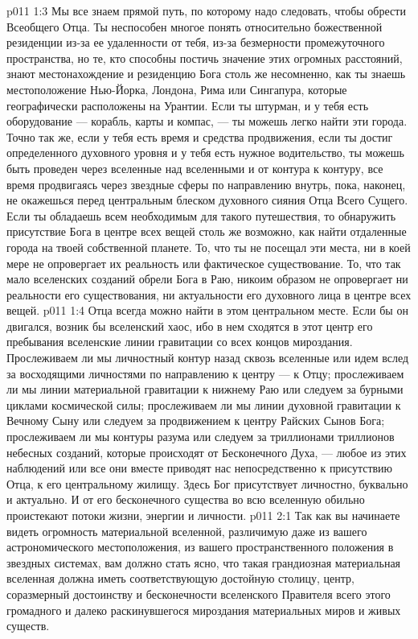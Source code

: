 \vs p011 1:3 \pc Мы все знаем прямой путь, по которому надо следовать, чтобы обрести Всеобщего Отца. Ты неспособен многое понять относительно божественной резиденции из\hyp{}за ее удаленности от тебя, из\hyp{}за безмерности промежуточного пространства, но те, кто способны постичь значение этих огромных расстояний, знают местонахождение и резиденцию Бога столь же несомненно, как ты знаешь местоположение Нью\hyp{}Йорка, Лондона, Рима или Сингапура, которые географически расположены на Урантии. Если ты штурман, и у тебя есть оборудование --- корабль, карты и компас, --- ты можешь легко найти эти города. Точно так же, если у тебя есть время и средства продвижения, если ты достиг определенного духовного уровня и у тебя есть нужное водительство, ты можешь быть проведен через вселенные над вселенными и от контура к контуру, все время продвигаясь через звездные сферы по направлению внутрь, пока, наконец, не окажешься перед центральным блеском духовного сияния Отца Всего Сущего. Если ты обладаешь всем необходимым для такого путешествия, то обнаружить присутствие Бога в центре всех вещей столь же возможно, как найти отдаленные города на твоей собственной планете. То, что ты не посещал эти места, ни в коей мере не опровергает их реальность или фактическое существование. То, что так мало вселенских созданий обрели Бога в Раю, никоим образом не опровергает ни реальности его существования, ни актуальности его духовного лица в центре всех вещей.
\vs p011 1:4 Отца всегда можно найти в этом центральном месте. Если бы он двигался, возник бы вселенский хаос, ибо в нем сходятся в этот центр его пребывания вселенские линии гравитации со всех концов мироздания. Прослеживаем ли мы личностный контур назад сквозь вселенные или идем вслед за восходящими личностями по направлению к центру --- к Отцу; прослеживаем ли мы линии материальной гравитации к нижнему Раю или следуем за бурными циклами космической силы; прослеживаем ли мы линии духовной гравитации к Вечному Сыну или следуем за продвижением к центру Райских Сынов Бога; прослеживаем ли мы контуры разума или следуем за триллионами триллионов небесных созданий, которые происходят от Бесконечного Духа, --- любое из этих наблюдений или все они вместе приводят нас непосредственно к присутствию Отца, к его центральному жилищу. Здесь Бог присутствует личностно, буквально и актуально. И от его бесконечного существа во всю вселенную обильно проистекают потоки жизни, энергии и личности.
\vs p011 2:1 Так как вы начинаете видеть огромность материальной вселенной, различимую даже из вашего астрономического местоположения, из вашего пространственного положения в звездных системах, вам должно стать ясно, что такая грандиозная материальная вселенная должна иметь соответствующую достойную столицу, центр, соразмерный достоинству и бесконечности вселенского Правителя всего этого громадного и далеко раскинувшегося мироздания материальных миров и живых существ.
